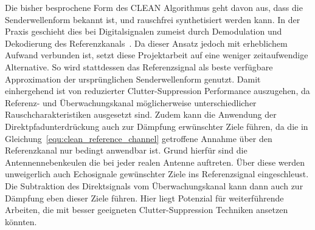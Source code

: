 Die bisher besprochene Form des CLEAN Algorithmus geht davon aus, dass die Senderwellenform bekannt ist, und rauschfrei synthetisiert werden kann. In der Praxis geschieht dies bei Digitalsignalen zumeist durch Demodulation und Dekodierung des Referenzkanals~\cite{Feng2013}. Da dieser Ansatz jedoch mit erheblichem Aufwand verbunden ist, setzt diese Projektarbeit auf eine weniger zeitaufwendige Alternative. So wird stattdessen das Referenzsignal als beste verfügbare Approximation der ursprünglichen Senderwellenform genutzt. Damit einhergehend ist von reduzierter Clutter-Suppression Performance auszugehen, da Referenz- und Überwachungskanal möglicherweise unterschiedlicher Rauschcharakteristiken ausgesetzt sind. Zudem kann die Anwendung der Direktpfadunterdrückung auch zur Dämpfung erwünschter Ziele führen, da die in Gleichung~\ref{equ:clean_reference_channel} getroffene Annahme über den Referenzkanal nur bedingt anwendbar ist. Grund hierfür sind die Antennennebenkeulen die bei jeder realen Antenne auftreten. Über diese werden unweigerlich auch Echosignale gewünschter Ziele ins Referenzsignal eingeschleust. Die Subtraktion des Direktsignals vom Überwachungskanal kann dann auch zur Dämpfung eben dieser Ziele führen. Hier liegt Potenzial für weiterführende Arbeiten, die mit besser geeigneten Clutter-Suppression Techniken ansetzen könnten.
